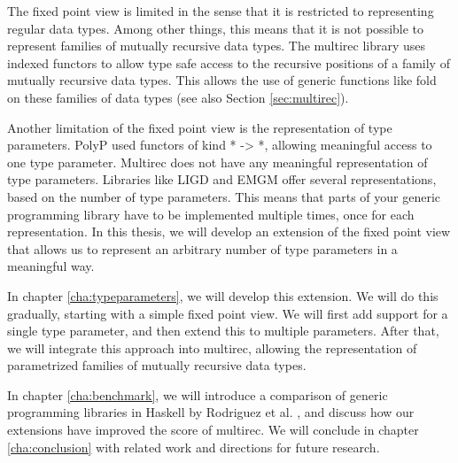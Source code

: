 The fixed point view is limited in the sense that it is restricted to
representing regular data types. Among other things, this means that
it is not possible to represent families of mutually recursive data
types. The multirec library \cite{multirec} uses indexed functors to
allow type safe access to the recursive positions of a family of
mutually recursive data types. This allows the use of generic
functions like fold on these families of data types (see also Section
\ref{sec:multirec}).

Another limitation of the fixed point view is the representation of
type parameters. PolyP used functors of kind * -> *, allowing
meaningful access to one type parameter. Multirec does not have any
meaningful representation of type parameters. Libraries like LIGD and
EMGM offer several representations, based on the number of type
parameters. This means that parts of your generic programming library
have to be implemented multiple times, once for each representation.
In this thesis, we will develop an extension of the fixed point view
that allows us to represent an arbitrary number of type parameters in
a meaningful way.

In chapter \ref{cha:typeparameters}, we will develop this extension.
We will do this gradually, starting with a simple fixed point view. We
will first add support for a single type parameter, and then extend
this to multiple parameters. After that, we will integrate this
approach into multirec, allowing the representation of parametrized
families of mutually recursive data types.

In chapter \ref{cha:benchmark}, we will introduce a comparison of
generic programming libraries in Haskell by Rodriguez et al.
\cite{benchmark}, and discuss how our extensions have improved the
score of multirec. We will conclude in chapter \ref{cha:conclusion}
with related work and directions for future research.
